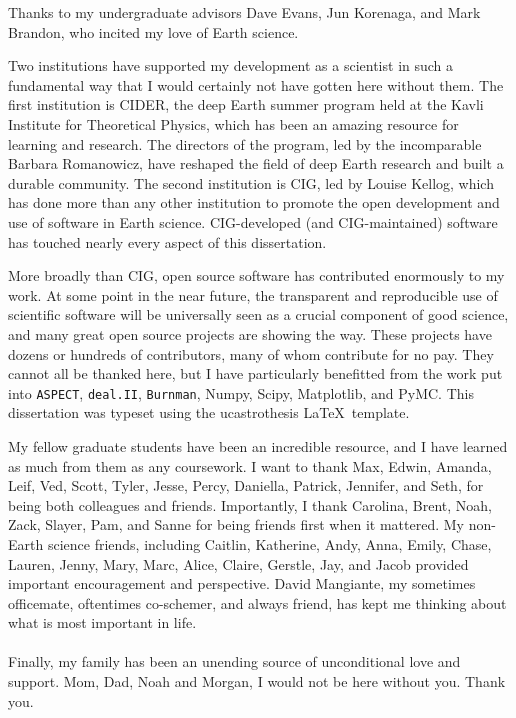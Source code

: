 \documentclass[12pt]{myucthesis}
\begin{document}
\begin{frontmatter}
\begin{acknowledgements}
Thanks to my undergraduate advisors Dave Evans, Jun Korenaga, and Mark Brandon, who
incited my love of Earth science.

Two institutions have supported my development as a scientist in such a fundamental
way that I would certainly not have gotten here without them.
The first institution is CIDER, the deep Earth summer program held 
at the Kavli Institute for Theoretical Physics, 
which has been an amazing resource for learning and research.
The directors of the program, led by the incomparable Barbara Romanowicz,
have reshaped the field of deep Earth research and built a durable community.
The second institution is CIG, led by Louise Kellog, which has done more than any other institution
to promote the open development and use of software in Earth science.
CIG-developed (and CIG-maintained) software has touched nearly every aspect of this dissertation.

More broadly than CIG, open source software has contributed enormously to my work.
At some point in the near future, the transparent and reproducible use of scientific
software will be universally seen as a crucial component of good science, and many great
open source projects are showing the way. These projects have dozens or hundreds of
contributors, many of whom contribute for no pay.
They cannot all be thanked here, but I have particularly benefitted from
the work put into \texttt{ASPECT}, \texttt{deal.II}, \texttt{Burnman},
Numpy, Scipy, Matplotlib, and PyMC.
This dissertation was typeset using the ucastrothesis \LaTeX\ template.

My fellow graduate students have been an incredible resource, and I
have learned as much from them as any coursework. I want to thank
Max, Edwin, Amanda, Leif, Ved, Scott, Tyler, Jesse, Percy, Daniella, Patrick, Jennifer, and Seth,
for being both colleagues and friends.
Importantly, I thank Carolina, Brent, Noah, Zack, Slayer, Pam, and Sanne for being friends first when it mattered.
My non-Earth science friends, including 
Caitlin, Katherine, Andy, Anna, Emily, Chase, Lauren, Jenny, Mary, Marc, Alice, Claire, Gerstle, Jay, and Jacob
provided important encouragement and perspective.
David Mangiante, my sometimes officemate, oftentimes co-schemer, and always friend, has kept me thinking about what is most important in life.
\\
\\
Finally, my family has been an unending source of unconditional love and support. 
Mom, Dad, Noah and Morgan, I would not be here without you. Thank you.

\end{acknowledgements}
\end{frontmatter}








\end{document}
